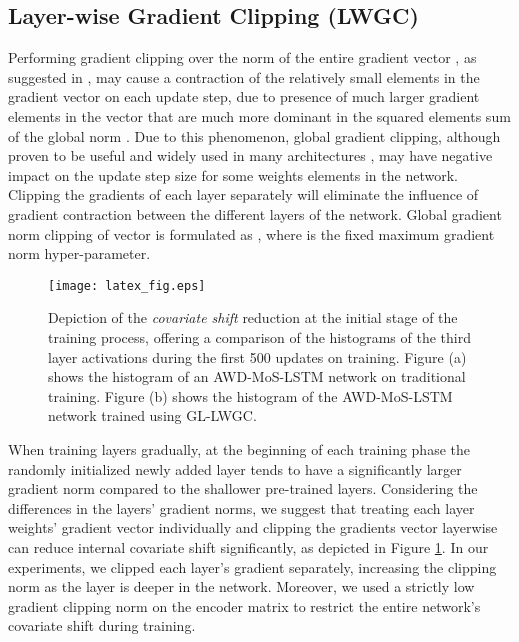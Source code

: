 \documentclass{article}
\begin{document}
\subsection{Layer-wise Gradient Clipping (LWGC)} \label{lwgc}
Performing gradient clipping over the norm of the entire gradient vector , as suggested in \cite{pascanu}, may cause a contraction of the relatively small elements in the gradient vector on each update step, due to presence of much larger gradient elements in the vector that are much more dominant in the squared elements sum of the global norm . Due to this phenomenon, global gradient clipping, although proven to be useful and widely used in many architectures \cite{Regularizing_Optimizing_LSTM_LM, mos,Zaremba}, may have negative impact on the update step size for some weights elements in the network.
Clipping the gradients of each layer separately will eliminate the influence of gradient contraction between the different layers of the network.
 Global gradient norm clipping of vector  is formulated as , where  is the fixed maximum gradient norm hyper-parameter.
  


  
\begin{figure}[!ht]
  \centering
  \texttt{[image: latex\_fig.eps]}
  \caption{Depiction of the \textit{covariate shift} reduction at the initial stage of the training process, offering a comparison of the histograms of the third layer activations during the first 500 updates on training. Figure (a) shows the histogram of an AWD-MoS-LSTM network on traditional training. Figure (b) shows the histogram of the AWD-MoS-LSTM network trained using GL-LWGC.}
  \label{covariate-shift}
\end{figure}


When training layers gradually, at the beginning of each training phase the randomly initialized newly added layer tends to have a significantly larger gradient norm compared to the shallower pre-trained layers. Considering the differences in the layers' gradient norms, we suggest that treating each layer weights' gradient vector individually and clipping the gradients vector layerwise can reduce internal covariate shift significantly, as depicted in Figure \ref{covariate-shift}. 
In our experiments, we clipped each layer's gradient separately, increasing the clipping norm as the layer is deeper in the network. Moreover, we used a strictly low gradient clipping norm on the encoder matrix to restrict the entire network's covariate shift during training.
\end{document}
